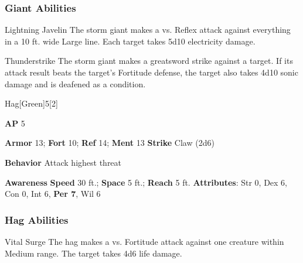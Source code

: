 \subsubsection{Giant Abilities}

\begin{ability}{Lightning Javelin}
The storm giant makes a  vs. Reflex attack against everything in a 10 ft. wide Large line.
\hit Each target takes 5d10 electricity damage.
\end{ability}

\vspace{0.5em}
\begin{ability}{Thunderstrike}
The storm giant makes a greatsword strike against a target.
If its attack result beats the target's Fortitude defense,
the target also takes 4d10 sonic damage
and is deafened as a condition.
\end{ability}

\begin{monsection}{Hag}[Green]{5}[2]
\vspace{-1em}\vspace{-1em}
\begin{spellcontent}
\begin{spelltargetinginfo}
{\textbf{AP} 5}

\pari \textbf{Armor} 13;
\textbf{Fort} 10;
\textbf{Ref} 14;
\textbf{Ment} 13
\pari \textbf{Strike} Claw  (2d6)



\pari \textbf{Behavior} Attack highest threat
\end{spelltargetinginfo}
\end{spellcontent}

\begin{monsterfooter}
\pari \textbf{Awareness} 
\pari \textbf{Speed} 30 ft.;
\textbf{Space} 5 ft.;
\textbf{Reach} 5 ft.
\pari \textbf{Attributes}:
Str 0,
Dex 6,
Con 0,
Int 6,
\textbf{Per 7},
Wil 6
\end{monsterfooter}
\end{monsection}


\subsubsection{Hag Abilities}

\begin{ability}{Vital Surge}
The hag makes a  vs. Fortitude attack against one creature within Medium range.
\hit The target takes 4d6 life damage.
\end{ability}


